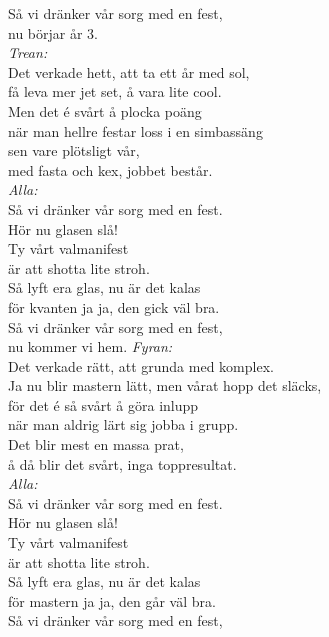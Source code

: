 \documentclass[a6paper, 10pt, twoside]{article}
\begin{document}
\begin{lyrics}
Så vi dränker vår sorg med en fest, \\
nu börjar år 3.
\vspace{5pt} \\
\textit{Trean:} \\
Det verkade hett, att ta ett år med sol, \\
få leva mer jet set, å vara lite cool. \\
Men det é svårt å plocka poäng \\
när man hellre festar loss i en simbassäng \\
sen vare plötsligt vår, \\
med fasta och kex, jobbet består. 
\vspace{5pt} \\
\textit{Alla:} \\
Så vi dränker vår sorg med en fest. \\
Hör nu glasen slå! \\
Ty vårt valmanifest \\
är att shotta lite stroh. \\
Så lyft era glas, nu är det kalas \\
för kvanten ja ja, den gick väl bra. \\
Så vi dränker vår sorg med en fest, \\
nu kommer vi hem.
\newpage
\noindent
\textit{Fyran:} \\
Det verkade rätt, att grunda med komplex. \\
Ja nu blir mastern lätt, men vårat hopp det släcks, \\
för det é så svårt å göra inlupp \\
när man aldrig lärt sig jobba i grupp. \\
Det blir mest en massa prat, \\
å då blir det svårt, inga toppresultat. 
\vspace{5pt} \\
\textit{Alla:} \\
Så vi dränker vår sorg med en fest. \\
Hör nu glasen slå! \\
Ty vårt valmanifest \\
är att shotta lite stroh. \\
Så lyft era glas, nu är det kalas \\
för mastern ja ja, den går väl bra. \\
Så vi dränker vår sorg med en fest, \\

\end{lyrics}
\end{document}
